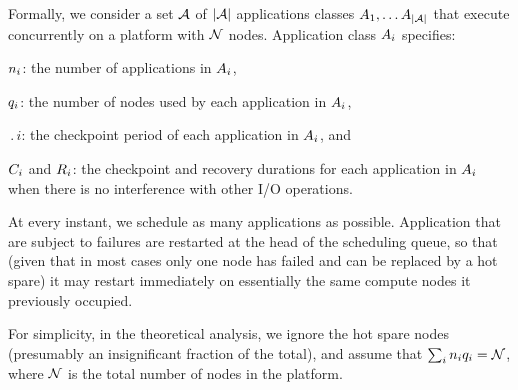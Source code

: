 Formally, we consider a set ${\mathcal A}$ of $|{\mathcal A}|$ applications classes
$A_{1}, \ldots A_{|{\mathcal A}|}$ that execute concurrently on a platform with
${\mathcal N}$ nodes. Application class $A_{i}$ specifies:
\begin{compactitem}
\item $n_{i}$: the number of applications in $A_{i}$,
\item $q_{i}$: the number of nodes used by each application in $A_{i}$,
\item $\period{i}$: the checkpoint period of each application in $A_{i}$, and
\item $C_{i}$ and $R_{i}$: the checkpoint and recovery durations for each application in $A_{i}$ when there is no interference with other I/O operations.
\end{compactitem}
%
%
At every instant, we schedule as many applications as possible.
Application that are subject to failures are restarted at the head of
the scheduling queue, so that (given that in most cases only one
node has failed and can be replaced by a hot spare) it may restart
immediately on essentially the same compute nodes it previously occupied.

For simplicity, in the theoretical analysis, we ignore the hot spare
nodes (presumably an insignificant fraction of the total),
and assume that $\sum_{i}n_{i} q_{i} = {\mathcal N}$, 
where ${\mathcal N}$ is the total number of nodes in the platform.


